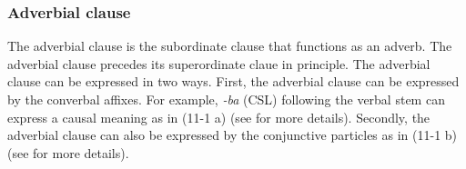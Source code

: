 \subsubsection{Adverbial clause}
\label{bkm:Ref306760232}\hypertarget{RefHeadingToc395697252}{}\label{bkm:Ref367266587}
The adverbial clause is the subordinate clause that functions as an adverb. The adverbial clause precedes its superordinate claue in principle. The adverbial clause can be expressed in two ways. First, the adverbial clause can be expressed by the converbal affixes. For example, \textit{{}-ba} (CSL) following the verbal stem can express a causal meaning as in (11-1 a) (see  for more details). Secondly, the adverbial clause can also be expressed by the conjunctive particles as in (11-1 b) (see  for more details).

\tablefirsthead{}


